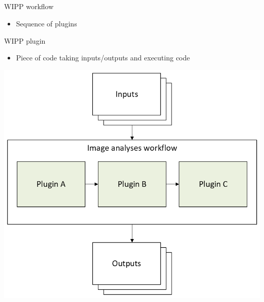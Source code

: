 \subsection{\slidetitle}
\begin{frame}
  \frametitle{\sectiontitle}
  \framesubtitle{\slidetitle}

  \begin{minipage}[h!]{0.40\textwidth}
    WIPP workflow
    \begin{itemize}
      \item Sequence of plugins
    \end{itemize}

    \bigskip

    WIPP plugin
    \begin{itemize}
      \item Piece of code taking inputs/outputs and executing code
    \end{itemize}
  \end{minipage}\hfill
  \begin{minipage}[h!]{0.55\textwidth}
    \includegraphics[scale=0.55]{./img/1_background/plugins.png}
  \end{minipage}
\end{frame}

\def\slidetitle{AI model cards}

